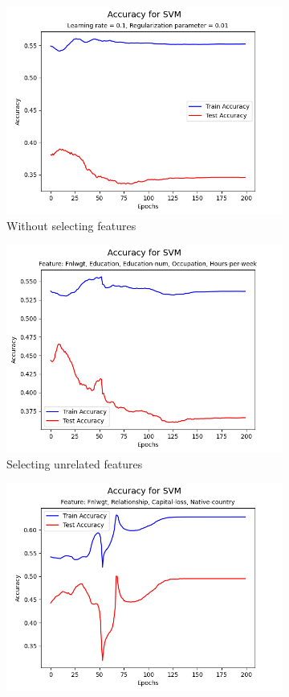 \documentclass[a4paper, utf8]{ctexart}
\begin{document}
	\begin{figure}[htbp]
		\centering
		\begin{subfigure}{.32\textwidth}
			\centering
			\includegraphics[width=.9\textwidth]{./figure/myplotFS1.png}
			\caption{Without selecting features}
		\end{subfigure}
		\begin{subfigure}{.32\textwidth}
			\centering
			\includegraphics[width=.9\textwidth]{./figure/myplotF7.png}
			\caption{Selecting unrelated features}
		\end{subfigure}
		\begin{subfigure}{.32\textwidth}
			\centering
			\includegraphics[width=.9\textwidth]{./figure/myplotF5.png}

\end{subfigure}
\end{figure}
\end{document}
